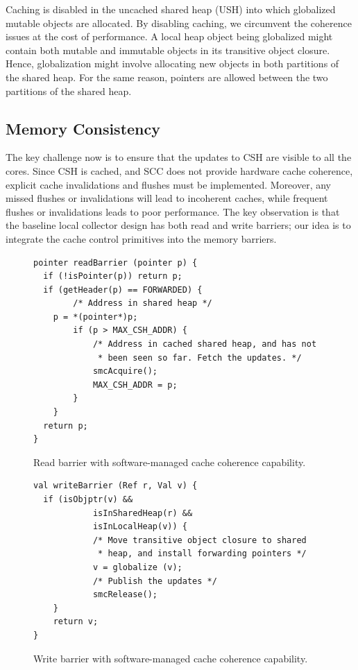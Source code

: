 Caching is disabled in the uncached shared heap (USH) into which globalized
mutable objects are allocated. By disabling caching, we circumvent the
coherence issues at the cost of performance. A local heap object being
globalized might contain both mutable and immutable objects in its transitive
object closure. Hence, globalization might involve allocating new objects in
both partitions of the shared heap. For the same reason, pointers are allowed
between the two partitions of the shared heap.

\subsection{Memory Consistency}

The key challenge now is to ensure that the updates to CSH are visible to all
the cores. Since CSH is cached, and SCC does not provide hardware cache
coherence, explicit cache invalidations and flushes must be implemented.
Moreover, any missed flushes or invalidations will lead to incoherent caches,
while frequent flushes or invalidations leads to poor performance. The key
observation is that the baseline local collector design has both read and write
barriers; our idea is to integrate the cache control primitives into the memory
barriers.

\begin{figure}
\begin{lstlisting}
pointer readBarrier (pointer p) {
  if (!isPointer(p)) return p;
  if (getHeader(p) == FORWARDED) {
		/* Address in shared heap */
    p = *(pointer*)p;
		if (p > MAX_CSH_ADDR) {
			/* Address in cached shared heap, and has not
			 * been seen so far. Fetch the updates. */
			smcAcquire();
			MAX_CSH_ADDR = p;
		}
	}
  return p;
}
\end{lstlisting}
\caption{Read barrier with software-managed cache coherence capability.}
\label{code:read_barrier_smc}
\end{figure}

\begin{figure}
\begin{lstlisting}
val writeBarrier (Ref r, Val v) {
  if (isObjptr(v) &&
			isInSharedHeap(r) &&
			isInLocalHeap(v)) {
			/* Move transitive object closure to shared
			 * heap, and install forwarding pointers */
			v = globalize (v);
			/* Publish the updates */
			smcRelease();
	}
	return v;
}
\end{lstlisting}
\caption{Write barrier with software-managed cache coherence capability.}
\label{code:write_barrier_smc}
\end{figure}


